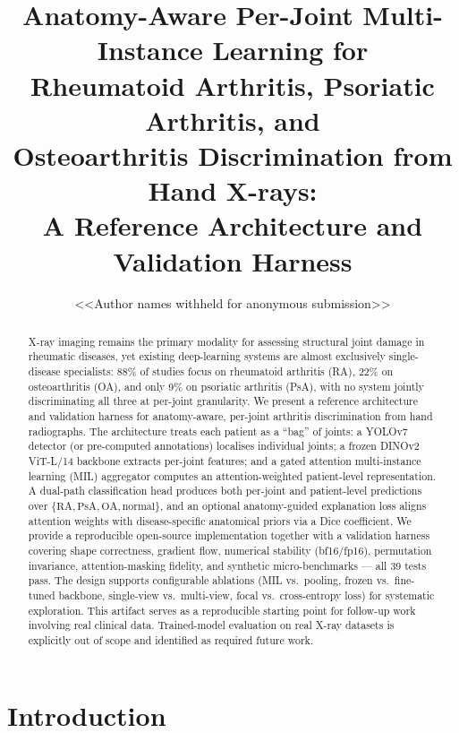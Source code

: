 \documentclass{article}
\title{Anatomy-Aware Per-Joint Multi-Instance Learning for \\ Rheumatoid Arthritis, Psoriatic Arthritis, and \\ Osteoarthritis Discrimination from Hand X-rays: \\ A Reference Architecture and Validation Harness}
\author{%
  \textless\textless Author names withheld for anonymous submission\textgreater\textgreater
}
\begin{document}
\maketitle

\begin{abstract}
X-ray imaging remains the primary modality for assessing structural joint damage in rheumatic diseases, yet existing deep-learning systems are almost exclusively single-disease specialists: 88\% of studies focus on rheumatoid arthritis (RA), 22\% on osteoarthritis (OA), and only 9\% on psoriatic arthritis (PsA), with no system jointly discriminating all three at per-joint granularity. We present a reference architecture and validation harness for anatomy-aware, per-joint arthritis discrimination from hand radiographs. The architecture treats each patient as a ``bag'' of joints: a YOLOv7 detector (or pre-computed annotations) localises individual joints; a frozen DINOv2 ViT-L/14 backbone extracts per-joint features; and a gated attention multi-instance learning (MIL) aggregator computes an attention-weighted patient-level representation. A dual-path classification head produces both per-joint and patient-level predictions over $\{\text{RA}, \text{PsA}, \text{OA}, \text{normal}\}$, and an optional anatomy-guided explanation loss aligns attention weights with disease-specific anatomical priors via a Dice coefficient. We provide a reproducible open-source implementation together with a validation harness covering shape correctness, gradient flow, numerical stability (bf16/fp16), permutation invariance, attention-masking fidelity, and synthetic micro-benchmarks --- all 39 tests pass. The design supports configurable ablations (MIL vs.\ pooling, frozen vs.\ fine-tuned backbone, single-view vs.\ multi-view, focal vs.\ cross-entropy loss) for systematic exploration. This artifact serves as a reproducible starting point for follow-up work involving real clinical data. Trained-model evaluation on real X-ray datasets is explicitly out of scope and identified as required future work.
\end{abstract}

\section{Introduction}
\end{document}
